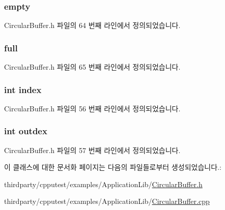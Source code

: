 \subsubsection[{\texorpdfstring{empty}{empty}}]{ empty\hspace{0.3cm}{\ttfamily [private]}}\hypertarget{class_circular_buffer_a9625b002313a3fef67010c74415e5911}{}\label{class_circular_buffer_a9625b002313a3fef67010c74415e5911}


Circular\+Buffer.\+h 파일의 64 번째 라인에서 정의되었습니다.

\subsubsection[{\texorpdfstring{full}{full}}]{ full\hspace{0.3cm}{\ttfamily [private]}}\hypertarget{class_circular_buffer_a19f31d9744c12503a9cbdaa1fd3a9848}{}\label{class_circular_buffer_a19f31d9744c12503a9cbdaa1fd3a9848}


Circular\+Buffer.\+h 파일의 65 번째 라인에서 정의되었습니다.

\subsubsection[{\texorpdfstring{index}{index}}]{\setlength{\rightskip}{0pt plus 5cm}int index\hspace{0.3cm}{\ttfamily [private]}}\hypertarget{class_circular_buffer_a750b5d744c39a06bfb13e6eb010e35d0}{}\label{class_circular_buffer_a750b5d744c39a06bfb13e6eb010e35d0}


Circular\+Buffer.\+h 파일의 56 번째 라인에서 정의되었습니다.

\subsubsection[{\texorpdfstring{outdex}{outdex}}]{\setlength{\rightskip}{0pt plus 5cm}int outdex\hspace{0.3cm}{\ttfamily [private]}}\hypertarget{class_circular_buffer_a1dc0e18118d416f24b42621f06cda31d}{}\label{class_circular_buffer_a1dc0e18118d416f24b42621f06cda31d}


Circular\+Buffer.\+h 파일의 57 번째 라인에서 정의되었습니다.



이 클래스에 대한 문서화 페이지는 다음의 파일들로부터 생성되었습니다.\+:\begin{DoxyCompactItemize}
\item 
thirdparty/cpputest/examples/\+Application\+Lib/\hyperlink{_circular_buffer_8h}{Circular\+Buffer.\+h}\item 
thirdparty/cpputest/examples/\+Application\+Lib/\hyperlink{_circular_buffer_8cpp}{Circular\+Buffer.\+cpp}\end{DoxyCompactItemize}

